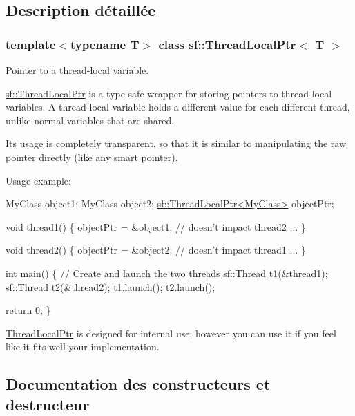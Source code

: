 \subsection{Description détaillée}
\subsubsection*{template$<$typename T$>$\newline
class sf\+::\+Thread\+Local\+Ptr$<$ T $>$}

Pointer to a thread-\/local variable. 

\hyperlink{classsf_1_1ThreadLocalPtr}{sf\+::\+Thread\+Local\+Ptr} is a type-\/safe wrapper for storing pointers to thread-\/local variables. A thread-\/local variable holds a different value for each different thread, unlike normal variables that are shared.

Its usage is completely transparent, so that it is similar to manipulating the raw pointer directly (like any smart pointer).

Usage example\+: 
\begin{DoxyCode}
MyClass object1;
MyClass object2;
\hyperlink{classsf_1_1ThreadLocalPtr}{sf::ThreadLocalPtr<MyClass>} objectPtr;

\textcolor{keywordtype}{void} thread1()
\{
    objectPtr = &object1; \textcolor{comment}{// doesn't impact thread2}
    ...
\}

\textcolor{keywordtype}{void} thread2()
\{
    objectPtr = &object2; \textcolor{comment}{// doesn't impact thread1}
    ...
\}

\textcolor{keywordtype}{int} main()
\{
    \textcolor{comment}{// Create and launch the two threads}
    \hyperlink{classsf_1_1Thread}{sf::Thread} t1(&thread1);
    \hyperlink{classsf_1_1Thread}{sf::Thread} t2(&thread2);
    t1.launch();
    t2.launch();

    \textcolor{keywordflow}{return} 0;
\}
\end{DoxyCode}


\hyperlink{classsf_1_1ThreadLocalPtr}{Thread\+Local\+Ptr} is designed for internal use; however you can use it if you feel like it fits well your implementation. 

\subsection{Documentation des constructeurs et destructeur}
\mbox{\label{classsf_1_1ThreadLocalPtr_a8c678211d7828d2a8c41cb534422d649}} 
